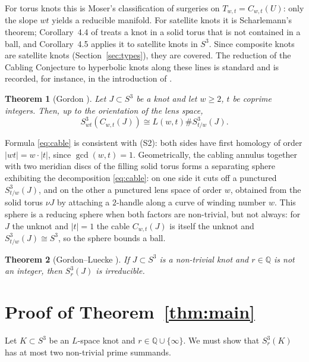 \documentclass[11pt]{article}
\newcommand{\Q}{\mathbb Q}
\newcommand{\Surg}[2]{S^3_{#1}(#2)}
\newcommand{\nbd}{\nu}
\newtheorem{theorem}{Theorem}[section]
\theoremstyle{definition}
\theoremstyle{remark}
\begin{document}
For torus knots this is Moser's classification of surgeries on
\(T_{w,t}=C_{w,t}(U)\): only the slope \(wt\) yields a reducible
manifold. For satellite knots it is Scharlemann's theorem; Corollary~4.4
of \cite{Scharlemann1990} treats a knot in a solid torus that is not
contained in a ball, and Corollary~4.5 applies it to satellite knots in
\(S^3\). Since composite knots are satellite knots
(Section~\ref{sec:types}), they are covered. The reduction of the
Cabling Conjecture to hyperbolic knots along these lines is standard and
is recorded, for instance, in the introduction of \cite{HLZ2015}.

\begin{theorem}[Gordon {\cite[Corollary~7.3]{Gordon1983}}]\label{thm:gordon}
Let \(J\subset S^3\) be a knot and let \(w\geq2\), \(t\) be coprime
integers. Then, up to the orientation of the lens space,
\begin{equation}\label{eq:cable}
 \Surg{wt}{C_{w,t}(J)}\cong L(w,t)\#\Surg{t/w}{J}.
\end{equation}
\end{theorem}

Formula \eqref{eq:cable} is consistent with (S2): both sides have first
homology of order \(|wt|=w\cdot|t|\), since \(\gcd(w,t)=1\). Geometrically,
the cabling annulus together with two meridian discs of the filling
solid torus forms a separating sphere exhibiting the decomposition
\eqref{eq:cable}: on one side it cuts off a punctured \(\Surg{t/w}{J}\),
and on the other a punctured lens space of order \(w\), obtained from
the solid torus \(\nbd J\) by attaching a \(2\)-handle along a curve of
winding number \(w\). This sphere is a reducing sphere when both factors
are non-trivial, but not always: for \(J\) the unknot and \(|t|=1\) the
cable \(C_{w,t}(J)\) is itself the unknot and \(\Surg{t/w}{J}\cong S^3\),
so the sphere bounds a ball.

\begin{theorem}[Gordon--Luecke {\cite{GordonLuecke1987}}]\label{thm:gl}
If \(J\subset S^3\) is a non-trivial knot and \(r\in\Q\) is not an
integer, then \(\Surg{r}{J}\) is irreducible.
\end{theorem}

\section{Proof of Theorem~\ref{thm:main}}\label{sec:proof}

Let \(K\subset S^3\) be an \(L\)-space knot and \(r\in\Q\cup\{\infty\}\).
We must show that \(\Surg{r}{K}\) has at most two non-trivial prime
summands.
\end{document}
